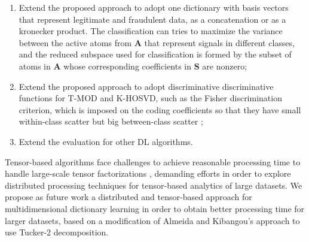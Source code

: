 \begin{enumerate}
	\item Extend the proposed approach to adopt one dictionary with basis vectors that represent legitimate and fraudulent data, as a concatenation or as a kronecker product. The classification can tries to maximize the variance between the active atoms from $\textbf{A}$ that represent signals in different classes, and the reduced subspace used for classification is formed by the subset of atoms in $\textbf{A}$ whose corresponding coefficients in $\textbf{S}$ are nonzero;
	\item Extend the proposed approach to adopt discriminative discriminative functions for T-MOD and K-HOSVD, such as the Fisher discrimination criterion, which is imposed on the coding coefficients so that they have small
within-class scatter but big between-class scatter \cite{yang2011fisher};
	\item Extend the evaluation for other DL algorithms.
\end{enumerate}

Tensor-based algorithms face challenges to achieve reasonable processing time to handle large-scale tensor factorizations \cite{de2014distributed}, demanding efforts in order to explore distributed processing techniques for tensor-based analytics of large datasets. We propose as future work a distributed and tensor-based approach for multidimensional dictionary learning in order to obtain better processing time for larger datasets, based on a modification of Almeida and Kibangou's \cite{de2014distributed} approach to use Tucker-2 decomposition.